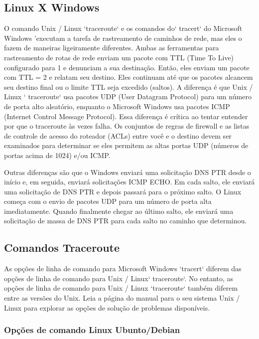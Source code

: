 \documentclass[
	article,			%
	11pt,				%
	oneside,			%
	a4paper,			%
	english,			%
	brazil,				%
	sumario=tradicional
	]{abntex2}
\begin{document}
\subsection{Linux X Windows}
O comando Unix / Linux `traceroute` e os comandos do` tracert` do Microsoft Windows 'executam a tarefa de rastreamento de caminhos de rede, mas eles o fazem de maneiras ligeiramente diferentes. Ambas as ferramentas para rastreamento de rotas de rede enviam um pacote com TTL (Time To Live) configurado para 1 e denunciam a sua destinação. Então, eles enviam um pacote com TTL = 2 e relatam seu destino. Eles continuam até que os pacotes alcancem seu destino final ou o limite TTL seja excedido (saltos). A diferença é que Unix / Linux ` traceroute` usa pacotes UDP (User Datagram Protocol) para um número de porta alto aleatório, enquanto o Microsoft Windows usa pacotes ICMP (Internet Control Message Protocol). Essa diferença é crítica ao tentar entender por que o traceroute às vezes falha. Os conjuntos de regras de firewall e as listas de controle de acesso do roteador (ACLs) entre você e o destino devem ser examinados para determinar se eles permitem as altas portas UDP (números de portas acima de 1024) e/ou ICMP.\cite{tech-faq}

Outras diferenças são que o Windows enviará uma solicitação DNS PTR desde o início e, em seguida, enviará solicitações ICMP ECHO. Em cada salto, ele enviará uma solicitação de DNS PTR e depois passará para o próximo salto. 
O Linux começa com o envio de pacotes UDP para um número de porta alta imediatamente. Quando finalmente chegar ao último salto, ele enviará uma solicitação de massa de DNS PTR para cada salto no caminho que determinou. \cite{Darren}

\subsection{Comandos Traceroute} \label{sec:comandos}
As opções de linha de comando para Microsoft Windows `tracert` diferem das opções de linha de comando para Unix / Linux` traceroute`. No entanto, as opções de linha de comando para Unix / Linux `traceroute` também diferem entre as versões do Unix. Leia a página do manual para o seu sistema Unix / Linux para explorar as opções de solução de problemas disponíveis.

\subsubsection{Opções de comando Linux Ubunto/Debian}
\end{document}
